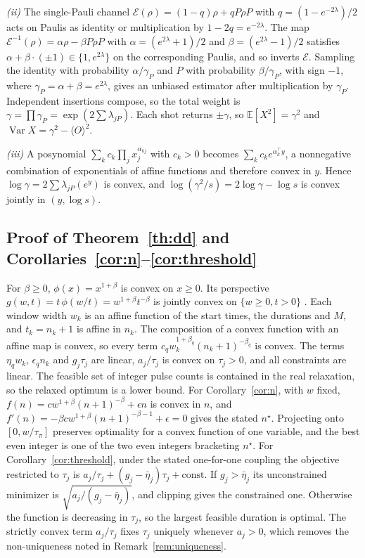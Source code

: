 \documentclass[10pt,letterpaper,journal]{IEEEtran}
\begin{document}
\emph{(ii)} The single-Pauli channel $\mathcal E(\rho)=(1-q)\rho+qP\rho P$ with $q=(1-e^{-2\lambda})/2$ acts on Paulis as identity or multiplication by $1-2q=e^{-2\lambda}$. The map $\mathcal E^{-1}(\rho)=\alpha\rho-\beta P\rho P$ with $\alpha=(e^{2\lambda}+1)/2$ and $\beta=(e^{2\lambda}-1)/2$ satisfies $\alpha+\beta\cdot(\pm1)\in\{1,e^{2\lambda}\}$ on the corresponding Paulis, and so inverts $\mathcal E$. Sampling the identity with probability $\alpha/\gamma_P$ and $P$ with probability $\beta/\gamma_P$, with sign $-1$, where $\gamma_P=\alpha+\beta=e^{2\lambda}$, gives an unbiased estimator after multiplication by $\gamma_P$. Independent insertions compose, so the total weight is $\gamma=\prod\gamma_P=\exp(2\sum\lambda_{jP})$. Each shot returns $\pm\gamma$, so $\mathbb E[X^2]=\gamma^2$ and $\operatorname{Var}X=\gamma^2-\langle O\rangle^2$.

\emph{(iii)} A posynomial $\sum_k c_k\prod_j x_j^{\alpha_{kj}}$ with $c_k>0$ becomes $\sum_kc_ke^{\alpha_k^\top y}$, a nonnegative combination of exponentials of affine functions and therefore convex in $y$. Hence $\log\gamma=2\sum\lambda_{jP}(e^y)$ is convex, and $\log(\gamma^2/s)=2\log\gamma-\log s$ is convex jointly in $(y,\log s)$.

\subsection{Proof of Theorem~\ref{th:dd} and Corollaries~\ref{cor:n}--\ref{cor:threshold}}
For $\beta\ge0$, $\phi(x)=x^{1+\beta}$ is convex on $x\ge0$. Its perspective $g(w,t)=t\,\phi(w/t)=w^{1+\beta}t^{-\beta}$ is jointly convex on $\{w\ge0,t>0\}$ \cite[\S3.2.6]{boydbook}. Each window width $w_k$ is an affine function of the start times, the durations and $M$, and $t_k=n_k+1$ is affine in $n_k$. The composition of a convex function with an affine map is convex, so every term $c_qw_k^{1+\beta_q}(n_k+1)^{-\beta_q}$ is convex. The terms $\eta_qw_k$, $\epsilon_qn_k$ and $g_j\tau_j$ are linear, $a_j/\tau_j$ is convex on $\tau_j>0$, and all constraints are linear. The feasible set of integer pulse counts is contained in the real relaxation, so the relaxed optimum is a lower bound. For Corollary~\ref{cor:n}, with $w$ fixed, $f(n)=cw^{1+\beta}(n+1)^{-\beta}+\epsilon n$ is convex in $n$, and $f'(n)=-\beta cw^{1+\beta}(n+1)^{-\beta-1}+\epsilon=0$ gives the stated $n^\star$. Projecting onto $[0,w/\tau_\pi]$ preserves optimality for a convex function of one variable, and the best even integer is one of the two even integers bracketing $n^\star$. For Corollary~\ref{cor:threshold}, under the stated one-for-one coupling the objective restricted to $\tau_j$ is $a_j/\tau_j+(g_j-\bar\eta_j)\tau_j+\mathrm{const}$. If $g_j>\bar\eta_j$ its unconstrained minimizer is $\sqrt{a_j/(g_j-\bar\eta_j)}$, and clipping gives the constrained one. Otherwise the function is decreasing in $\tau_j$, so the largest feasible duration is optimal. The strictly convex term $a_j/\tau_j$ fixes $\tau_j$ uniquely whenever $a_j>0$, which removes the non-uniqueness noted in Remark~\ref{rem:uniqueness}.
\end{document}
